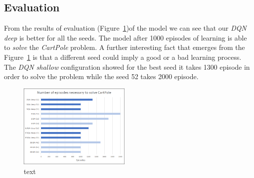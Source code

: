\subsection{Evaluation}

From the results of evaluation (Figure~\ref{fig:comparison})of the model we can see that our \textit{DQN deep} is better for all the seeds. The model after 1000 episodes of learning is able to \textit{solve} the \textit{CartPole} problem. A further interesting fact that emerges from the Figure~\ref{fig:comparison} is that a different seed could imply a good or a bad learning process. The \textit{DQN shallow} configuration showed for the best seed it takes 1300 episode in order to solve the problem while the seed 52 takes 2000 episode.

\begin{figure}
	\centering
	\includegraphics[width=0.48\textwidth]{res/Comparison}
	\caption{text}
	\label{fig:comparison}
\end{figure}
